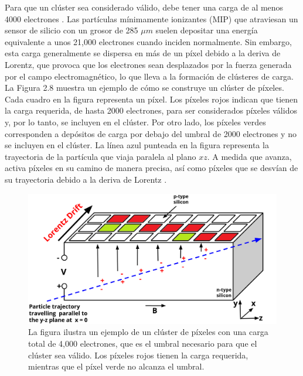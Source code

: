 Para que un clúster sea considerado válido, debe tener una carga de al menos 4000 electrones \cite{Track_Reco_2014,phase1_Pixel_Detector}. Las partículas mínimamente ionizantes (MIP) que atraviesan un sensor de silicio con un grosor de 285 $\mu m$ suelen depositar una energía equivalente a unos 21,000 electrones cuando inciden normalmente. Sin embargo, esta carga generalmente se dispersa en más de un píxel debido a la deriva de Lorentz, que provoca que los electrones sean desplazados por la fuerza generada por el campo electromagnético, lo que lleva a la formación de clústeres de carga.\\

La Figura 2.8 muestra un ejemplo de cómo se construye un clúster de píxeles. Cada cuadro en la figura representa un píxel. Los píxeles rojos indican que tienen la carga requerida, de hasta 2000 electrones, para ser considerados píxeles válidos y, por lo tanto, se incluyen en el clúster. Por otro lado, los píxeles verdes corresponden a depósitos de carga por debajo del umbral de 2000 electrones y no se incluyen en el clúster. La línea azul punteada en la figura representa la trayectoria de la partícula que viaja paralela al plano $xz$. A medida que avanza, activa píxeles en su camino de manera precisa, así como píxeles que se desvían de su trayectoria debido a la deriva de Lorentz \cite{Pixel_Hit_Reconstruction}.

\begin{center}
  \begin{figure}[h]
    \centering
    \includegraphics[scale=.25]{Chapter2/pixel_cluster.png} 
    \caption[Construcción de un pixel cluster]{La figura ilustra un ejemplo de un clúster de píxeles con una carga total de 4,000 electrones, que es el umbral necesario para que el clúster sea válido. Los píxeles rojos tienen la carga requerida, mientras que el píxel verde no alcanza el umbral.}
    \label{cluster}
  \end{figure}
\end{center}
